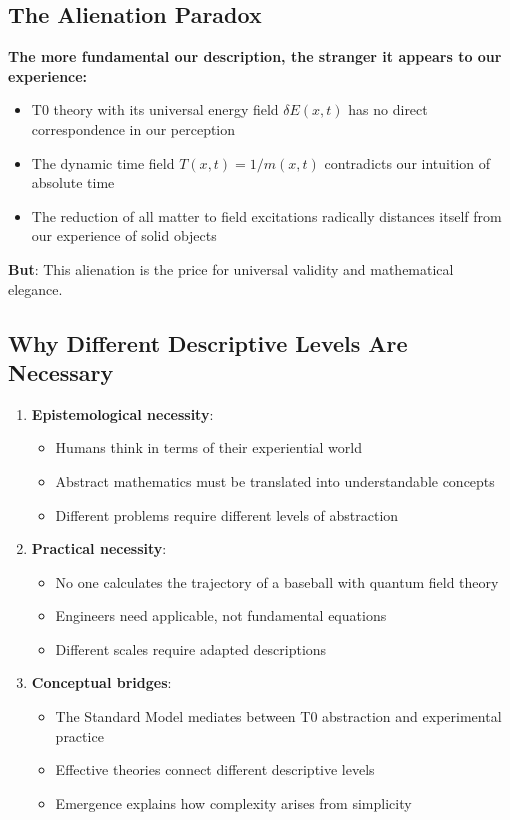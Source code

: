 	\subsection{The Alienation Paradox}
	
	\textbf{The more fundamental our description, the stranger it appears to our experience:}
	
	\begin{itemize}
		\item T0 theory with its universal energy field $\delta E(x,t)$ has no direct correspondence in our perception
		\item The dynamic time field $T(x,t) = 1/m(x,t)$ contradicts our intuition of absolute time
		\item The reduction of all matter to field excitations radically distances itself from our experience of solid objects
	\end{itemize}
	
	\textbf{But}: This alienation is the price for universal validity and mathematical elegance.
	
	\subsection{Why Different Descriptive Levels Are Necessary}
	
	\begin{enumerate}
		\item \textbf{Epistemological necessity}:
		\begin{itemize}
			\item Humans think in terms of their experiential world
			\item Abstract mathematics must be translated into understandable concepts
			\item Different problems require different levels of abstraction
		\end{itemize}
		
		\item \textbf{Practical necessity}:
		\begin{itemize}
			\item No one calculates the trajectory of a baseball with quantum field theory
			\item Engineers need applicable, not fundamental equations
			\item Different scales require adapted descriptions
		\end{itemize}
		
		\item \textbf{Conceptual bridges}:
		\begin{itemize}
			\item The Standard Model mediates between T0 abstraction and experimental practice
			\item Effective theories connect different descriptive levels
			\item Emergence explains how complexity arises from simplicity
		\end{itemize}
	\end{enumerate}
	
